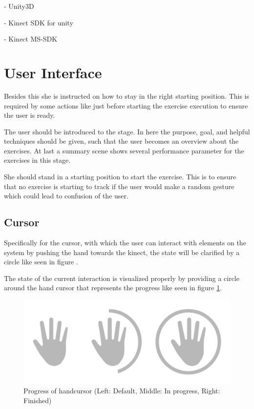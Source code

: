 - Unity3D

- Kinect SDK for unity

- Kinect MS-SDK

\section{User Interface}
Besides this she is instructed on how to stay in the right starting position. This is required by some actions like just before starting the exercise execution to ensure the user is ready.

The user should be introduced to the stage. In here the purpose, goal, and helpful techniques should be given, such that the user becomes an overview about the exercises. At last a summary scene shows several performance parameter for the exercises in this stage.

She should stand in a starting position to start the exercise. This is to ensure that no exercise is starting to track if the user would make a random gesture which could lead to confusion of the user.
\subsection{Cursor}
Specifically for the cursor, with which the user can interact with elements on the system by pushing the hand towards the kinect, the state will be clarified by a circle like seen in figure .

The state of the current interaction is visualized properly by providing a circle around the hand cursor that represents the progress like seen in figure \ref{fig:handcursorProgress}.
\begin{figure}[htb]
	\centering
	\begin{minipage}[t]{1\linewidth}
		\centering
		\includegraphics[width=0.6\linewidth]{Pictures/handcursorProgress}
		\caption{Progress of handcursor (Left: Default, Middle: In progress, Right: Finished)}
		\label{fig:handcursorProgress}
	\end{minipage}
\end{figure}



